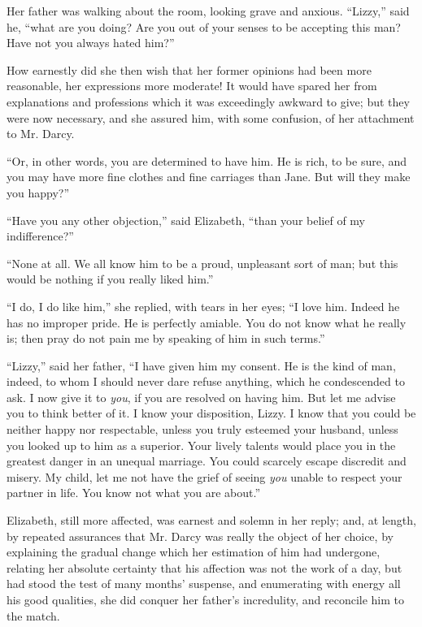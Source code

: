 \documentclass[12pt,openright]{book}
\begin{document}
Her father was walking about the room, looking grave and anxious. “Lizzy,” said he, “what are you doing? Are you out of your senses to be accepting this man? Have not you always hated him?”

How earnestly did she then wish that her former opinions had been more reasonable, her expressions more moderate! It would have spared her from explanations and professions which it was exceedingly awkward to give; but they were now necessary, and she assured him, with some confusion, of her attachment to Mr. Darcy.

“Or, in other words, you are determined to have him. He is rich, to be sure, and you may have more fine clothes and fine carriages than Jane. But will they make you happy?”

“Have you any other objection,” said Elizabeth, “than your belief of my indifference?”

“None at all. We all know him to be a proud, unpleasant sort of man; but this would be nothing if you really liked him.”

“I do, I do like him,” she replied, with tears in her eyes; “I love him. Indeed he has no improper pride. He is perfectly amiable. You do not know what he really is; then pray do not pain me by speaking of him in such terms.”

“Lizzy,” said her father, “I have given him my consent. He is the kind of man, indeed, to whom I should never dare refuse anything, which he condescended to ask. I now give it to \textit{you}, if you are resolved on having him. But let me advise you to think better of it. I know your disposition, Lizzy. I know that you could be neither happy nor respectable, unless you truly esteemed your husband, unless you looked up to him as a superior. Your lively talents would place you in the greatest danger in an unequal marriage. You could scarcely escape discredit and misery. My child, let me not have the grief of seeing \textit{you} unable to respect your partner in life. You know not what you are about.”

Elizabeth, still more affected, was earnest and solemn in her reply; and, at length, by repeated assurances that Mr. Darcy was really the object of her choice, by explaining the gradual change which her estimation of him had undergone, relating her absolute certainty that his affection was not the work of a day, but had stood the test of many months’ suspense, and enumerating with energy all his good qualities, she did conquer her father’s incredulity, and reconcile him to the match.
\end{document}
